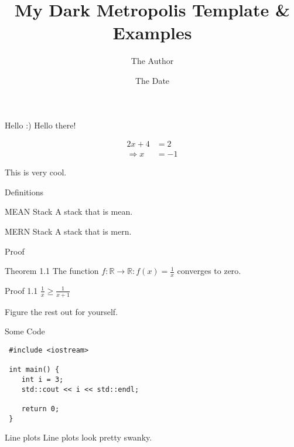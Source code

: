 \documentclass[11pt, aspectratio=169]{beamer}
\title{My Dark Metropolis Template \& Examples }
\author{The Author}
\date{The Date}
\institute[INST]{The Institute}
\begin{document}
\maketitle

\begin{frame}{Hello :)}
 Hello there!
 
 \begin{align*}
  2x + 4 &= 2 \\
  \Rightarrow x &= -1
 \end{align*}


 

 
 This is \alert{very} cool.
 
\end{frame}

\begin{frame}{Definitions}
\begin{block}{MEAN Stack}
A stack that is mean.
\end{block}

\vfill

\begin{block}{MERN Stack}
A stack that is mern.
\end{block} 
\end{frame}

\begin{frame}{Proof}

\begin{alertblock}{Theorem 1.1}
 The function $f : \mathbb{R} \rightarrow \mathbb{R} : f(x) = \frac{1}{x}$ converges to zero.
\end{alertblock}


\begin{exampleblock}{Proof 1.1}
 $\frac{1}{x} \geq \frac{1}{x+1}$
 
 Figure the rest out for yourself.
\end{exampleblock}
 

\end{frame}


\begin{frame}[fragile]{Some Code}
 \begin{lstlisting}
 #include <iostream>
 
 int main() {
    int i = 3;
    std::cout << i << std::endl;
    
    return 0;
 }
 \end{lstlisting}
\end{frame}

\begin{frame}{Line plots}
 Line plots look pretty \alert{swanky}.
   \begin{figure}
  \end{figure}
\end{frame}
\end{document}
